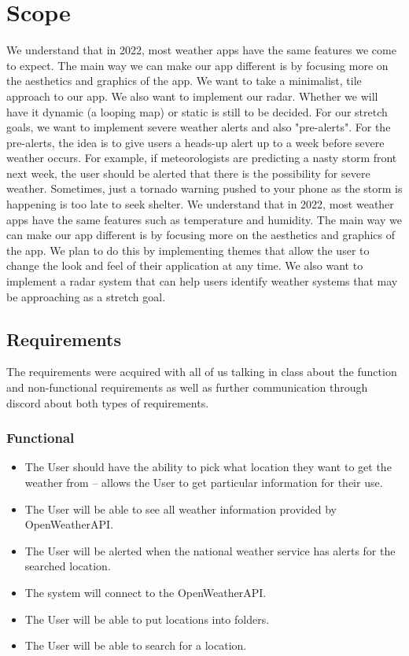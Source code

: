 \documentclass[10pt,conference,onecolumn,compsoc]{IEEEtran}
\begin{document}
\section{Scope}
	We understand that in 2022, most weather apps have the same features we come to expect. The main way we can make our app different is by focusing more on the aesthetics and graphics of the app. We want to take a minimalist, tile approach to our app. We also want to implement our radar. Whether we will have it dynamic (a looping map) or static is still to be decided. For our stretch goals, we want to implement severe weather alerts and also "pre-alerts". For the pre-alerts, the idea is to give users a heads-up alert up to a week before severe weather occurs. For example, if meteorologists are predicting a nasty storm front next week, the user should be alerted that there is the possibility for severe weather. Sometimes, just a tornado warning pushed to your phone as the storm is happening is too late to seek shelter.
	We understand that in 2022, most weather apps have the same features such as temperature and humidity. The main way we can make our app different is by focusing more on the aesthetics and graphics of the app. We plan to do this by
	implementing themes that allow the user to change the look and feel of their application at any time. We also want to implement a radar system that can help users identify weather systems that may be approaching as a stretch goal.


\subsection{Requirements}
The requirements were acquired with all of us talking in class about the function and non-functional requirements as well as further communication through discord about both types of requirements.

\subsubsection{Functional}
\begin{itemize}
\item The User should have the ability to pick what location they want to get the weather from -- allows the User to get particular information for their use.
\item The User will be able to see all weather information provided by OpenWeatherAPI.
\item The User will be alerted when the national weather service has alerts for the searched location.
\item The system will connect to the OpenWeatherAPI.
\item The User will be able to put locations into folders.
\item The User will be able to search for a location.
\end{itemize}
\end{document}
